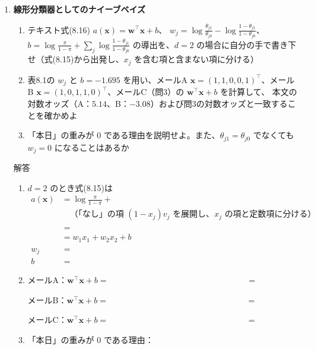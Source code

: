 \documentclass[a4paper,dvipdfmx]{jsarticle}
\newcommand{\提出期限}{2026年11月16日（月）}
\newcommand{\学籍番号}{0000000}
\newcommand{\氏名}{氏名を書く}
\newcommand{\提出日}{2026年11月16日}
\newenvironment{answer}{\begin{itembox}[l]{解答}}{\end{itembox}}
\begin{document}
\begin{enumerate}
  \item \textbf{線形分類器としてのナイーブベイズ}\quad
    \begin{enumerate}
      \item テキスト式(8.16) $a(\bm{x}) = \bm{w}^\top\bm{x} + b$、
        $w_j = \log\frac{\theta_{j1}}{\theta_{j0}} - \log\frac{1 - \theta_{j1}}{1 - \theta_{j0}}$、
        $b = \log\frac{\pi}{1 - \pi} + \sum_j \log\frac{1 - \theta_{j1}}{1 - \theta_{j0}}$
        の導出を、$d = 2$ の場合に自分の手で書き下せ（式(8.15)から出発し、$x_j$ を含む項と含まない項に分ける）
      \item 表8.1の $w_j$ と $b = -1.695$ を用い、メールA $\bm{x} = (1, 1, 0, 0, 1)^\top$、メールB $\bm{x} = (1, 0, 1, 1, 0)^\top$、メールC（問3）の $\bm{w}^\top\bm{x} + b$ を計算して、
        本文の対数オッズ（A：$5.14$、B：$-3.08$）および問3の対数オッズと一致することを確かめよ
      \item 「本日」の重みが $0$ である理由を説明せよ。また、$\theta_{j1} = \theta_{j0}$ でなくても $w_j = 0$ になることはあるか
    \end{enumerate}
    \begin{answer}
      \begin{enumerate}
        \item $d = 2$ のとき式(8.15)は
          \begin{align*}
            a(\bm{x}) &= \log\frac{\pi}{1 - \pi} + \phantom{XXXXXXXXXXXXXXXXXXXXXXXXXX} \\
            &\quad \text{（「なし」の項 } (1 - x_j) v_j \text{ を展開し、} x_j \text{ の項と定数項に分ける）} \\
            &= \phantom{XXXXXXXXXXXXXXXXXXXXXXXXXXXXXX} \\
            &= w_1 x_1 + w_2 x_2 + b \\
            w_j &= \phantom{XXXXXXXXXXXXXXXX} \\
            b &= \phantom{XXXXXXXXXXXXXXXX}
          \end{align*}
        \item メールA：$\bm{w}^\top\bm{x} + b = \phantom{XXXXXXXXXXXXXXXXXXXX} = $ \phantom{XXXXXX}
          \vspace{2mm}

          メールB：$\bm{w}^\top\bm{x} + b = \phantom{XXXXXXXXXXXXXXXXXXXX} = $ \phantom{XXXXXX}
          \vspace{2mm}

          メールC：$\bm{w}^\top\bm{x} + b = \phantom{XXXXXXXXXXXXXXXXXXXX} = $ \phantom{XXXXXX}
          \vspace{4mm}
        \item 「本日」の重みが $0$ である理由：
          \vspace{8mm}


\end{enumerate}
\end{answer}
\end{enumerate}
\end{document}
